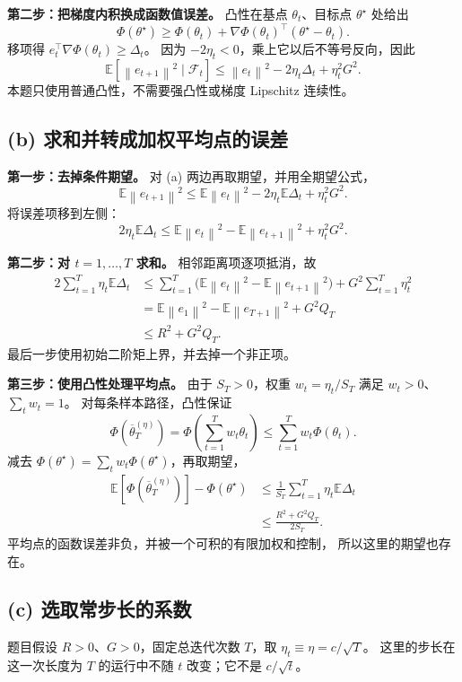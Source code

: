 \documentclass[UTF8,a4paper,11pt,fontset=fandol]{ctexart}
\newcommand{\E}{\mathbb E}
\newcommand{\norm}[1]{\left\lVert#1\right\rVert}
\begin{document}
\textbf{第二步：把梯度内积换成函数值误差。}
凸性在基点 $\theta_t$、目标点 $\theta^\star$ 处给出
\[
 \Phi(\theta^\star)\geq\Phi(\theta_t)
 +\nabla\Phi(\theta_t)^\top(\theta^\star-\theta_t).
\]
移项得 $e_t^\top\nabla\Phi(\theta_t)\geq\Delta_t$。
因为 $-2\eta_t<0$，乘上它以后不等号反向，因此
\[
 \boxed{\E[\norm{e_{t+1}}^2\mid\mathcal F_t]
 \leq\norm{e_t}^2-2\eta_t\Delta_t+\eta_t^2G^2.}
\]
本题只使用普通凸性，不需要强凸性或梯度 Lipschitz 连续性。

\subsection*{(b) 求和并转成加权平均点的误差}
\textbf{第一步：去掉条件期望。}
对 (a) 两边再取期望，并用全期望公式，
\[
 \E\norm{e_{t+1}}^2
 \leq\E\norm{e_t}^2-2\eta_t\E\Delta_t+\eta_t^2G^2.
\]
将误差项移到左侧：
\[
 2\eta_t\E\Delta_t
 \leq\E\norm{e_t}^2-\E\norm{e_{t+1}}^2+\eta_t^2G^2.
\]

\textbf{第二步：对 $t=1,\ldots,T$ 求和。}
相邻距离项逐项抵消，故
\begin{align*}
 2\sum_{t=1}^T\eta_t\E\Delta_t
 &\leq\sum_{t=1}^T\big(\E\norm{e_t}^2-\E\norm{e_{t+1}}^2\big)
   +G^2\sum_{t=1}^T\eta_t^2\\
 &=\E\norm{e_1}^2-\E\norm{e_{T+1}}^2+G^2Q_T\\
 &\leq R^2+G^2Q_T.
\end{align*}
最后一步使用初始二阶矩上界，并去掉一个非正项。

\textbf{第三步：使用凸性处理平均点。}
由于 $S_T>0$，权重 $w_t=\eta_t/S_T$ 满足 $w_t>0$、$\sum_tw_t=1$。
对每条样本路径，凸性保证
\[
 \Phi\left(\overline\theta_T^{(\eta)}\right)
 =\Phi\left(\sum_{t=1}^Tw_t\theta_t\right)
 \leq\sum_{t=1}^Tw_t\Phi(\theta_t).
\]
减去 $\Phi(\theta^\star)=\sum_tw_t\Phi(\theta^\star)$，再取期望，
\begin{align*}
 \E[\Phi(\overline\theta_T^{(\eta)})]-\Phi(\theta^\star)
 &\leq\frac1{S_T}\sum_{t=1}^T\eta_t\E\Delta_t\\
 &\leq\boxed{\frac{R^2+G^2Q_T}{2S_T}}.
\end{align*}
平均点的函数误差非负，并被一个可积的有限加权和控制，
所以这里的期望也存在。

\subsection*{(c) 选取常步长的系数}
题目假设 $R>0$、$G>0$，固定总迭代次数 $T$，取
$\eta_t\equiv\eta=c/\sqrt T$。
这里的步长在这一次长度为 $T$ 的运行中不随 $t$ 改变；它不是 $c/\sqrt t$。
\end{document}
